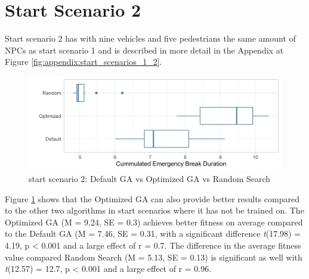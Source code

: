\section{Start Scenario 2}
Start scenario 2 has with nine vehicles and five pedestrians the same amount of NPCs as start scenario 1 and is described in more detail in the Appendix at Figure \ref{fig:appendix:start_scenarios_1_2}.

\begin{figure}[ht] 
	\includegraphics[width=1\linewidth]{simulations/evaluation/plots/sim_2_comparison}
	\caption{start scenario 2: Default GA vs Optimized GA vs Random Search}
	\label{fig:evaluation:sim_2_comparison}
\end{figure}

Figure \ref{fig:evaluation:sim_2_comparison} shows that the Optimized GA can also provide better results compared to the other two algorithms in start scenarios where it has not be trained on. The Optimized GA (M = 9.24, SE = 0.3) achieves better fitness on average compared to the Default GA (M = 7.46, SE = 0.31, with a significant difference \textit{t}(17.98) = 4.19, p < 0.001 and a large effect of r = 0.7. The difference in the average fitness value compared Random Search (M = 5.13, SE = 0.13) is significant as well with \textit{t}(12.57) = 12.7, p < 0.001 and a large effect of r = 0.96.

